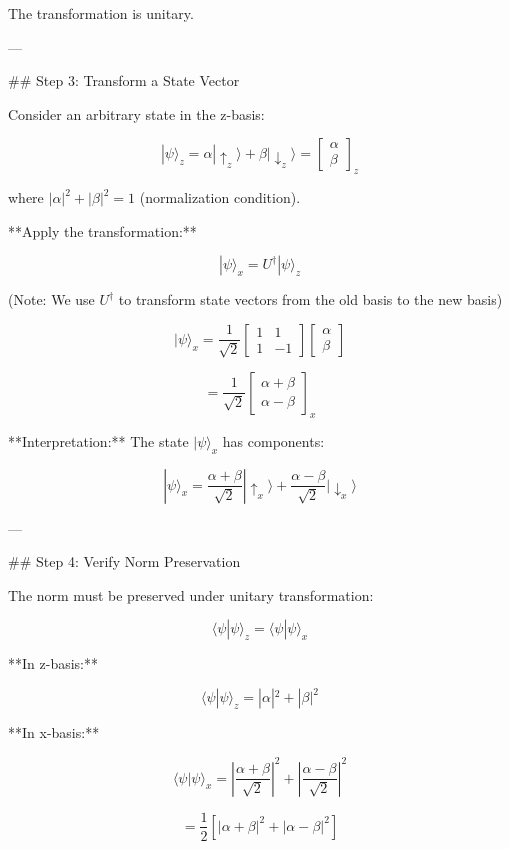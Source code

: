 The transformation is unitary.

---

## Step 3: Transform a State Vector

Consider an arbitrary state in the z-basis:

$$|\psi\rangle_z = \alpha |↑_z\rangle + \beta |↓_z\rangle = \begin{bmatrix} \alpha \\ \beta \end{bmatrix}_z$$

where $|\alpha|^2 + |\beta|^2 = 1$ (normalization condition).

**Apply the transformation:**

$$|\psi\rangle_x = U^\dagger |\psi\rangle_z$$

(Note: We use $U^\dagger$ to transform state vectors from the old basis to the new basis)

$$|\psi\rangle_x = \frac{1}{\sqrt{2}}\begin{bmatrix} 1 & 1 \\ 1 & -1 \end{bmatrix}\begin{bmatrix} \alpha \\ \beta \end{bmatrix}$$

$$= \frac{1}{\sqrt{2}}\begin{bmatrix} \alpha + \beta \\ \alpha - \beta \end{bmatrix}_x$$

**Interpretation:** The state $|\psi\rangle_x$ has components:

$$|\psi\rangle_x = \frac{\alpha + \beta}{\sqrt{2}} |↑_x\rangle + \frac{\alpha - \beta}{\sqrt{2}} |↓_x\rangle$$

---

## Step 4: Verify Norm Preservation

The norm must be preserved under unitary transformation:

$$\langle \psi | \psi \rangle_z = \langle \psi | \psi \rangle_x$$

**In z-basis:**

$$\langle \psi | \psi \rangle_z = |\alpha|^2 + |\beta|^2$$

**In x-basis:**

$$\langle \psi | \psi \rangle_x = \left|\frac{\alpha + \beta}{\sqrt{2}}\right|^2 + \left|\frac{\alpha - \beta}{\sqrt{2}}\right|^2$$

$$= \frac{1}{2}[|\alpha + \beta|^2 + |\alpha - \beta|^2]$$

